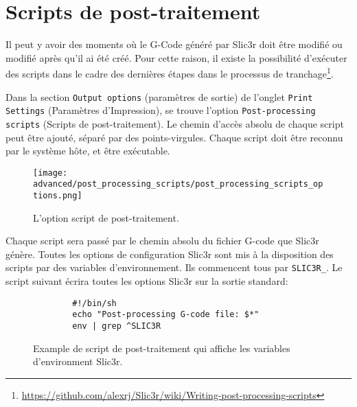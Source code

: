 
\section{Scripts de post-traitement} %
\label{sec:post_processing_scripts}

Il peut y avoir des moments o\`u le G-Code g\'en\'er\'e par Slic3r doit \^etre modifi\'e ou modifi\'e apr\`es qu'il ai \'et\'e cr\'e\'e. Pour cette raison, il existe la possibilit\'e d'ex\'ecuter des scripts dans le cadre des derni\`eres \'etapes dans le processus de tranchage\footnote{\url{https://github.com/alexrj/Slic3r/wiki/Writing-post-processing-scripts}}.

Dans la section \texttt{Output options} (param\`etres de sortie) de l'onglet \texttt{Print Settings} (Param\`etres d'Impression), se trouve l'option \texttt{Post-processing scripts} (Scripts de post-traitement).  Le chemin d'acc\`es absolu de chaque script peut \^etre ajout\'e, s\'epar\'e par des points-virgules. Chaque script doit \^etre reconnu par le syst\`eme h\^ote, et \^etre ex\'ecutable.

\begin{figure}[H]
\centering
\texttt{[image: advanced/post\_processing\_scripts/post\_processing\_scripts\_options.png]}
\caption{L'option script de post-traitement.}
\label{fig:post_processing_scripts_options}
\end{figure}

Chaque script sera pass\'e par le chemin absolu du fichier G-code que Slic3r g\'en\`ere. Toutes les options de configuration Slic3r sont mis \`a la disposition des scripts par des variables d'environnement.  Ils commencent tous par \texttt{SLIC3R\_}.  Le script suivant \'ecrira toutes les options Slic3r sur la sortie standard:

\begin{figure}[H]
\small
\begin{verbatim}
        #!/bin/sh
        echo "Post-processing G-code file: $*"
        env | grep ^SLIC3R
\end{verbatim}
\caption{Example de script de post-traitement qui affiche les variables d'environment Slic3r.}
\label{fig:exaple_post_processing_script_env_vars}
\end{figure}

